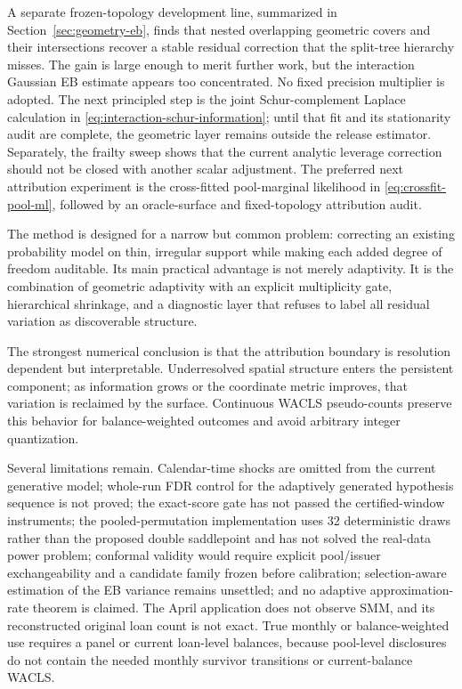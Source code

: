 \documentclass[11pt]{article}
\begin{document}
A separate frozen-topology development line, summarized in
Section~\ref{sec:geometry-eb}, finds that nested overlapping geometric covers and their
intersections recover a stable residual correction that the split-tree hierarchy misses. The gain is
large enough to merit further work, but the interaction Gaussian EB estimate appears too concentrated.
No fixed precision multiplier is adopted. The next principled step is the joint Schur-complement
Laplace calculation in \eqref{eq:interaction-schur-information}; until that fit and its stationarity
audit are complete, the geometric layer remains outside the release estimator. Separately, the
frailty sweep shows that the current analytic leverage correction should not be closed with another
scalar adjustment. The preferred next attribution experiment is the cross-fitted pool-marginal
likelihood in \eqref{eq:crossfit-pool-ml}, followed by an oracle-surface and fixed-topology
attribution audit.

The method is designed for a narrow but common problem: correcting an existing probability model on
thin, irregular support while making each added degree of freedom auditable. Its main practical
advantage is not merely adaptivity. It is the combination of geometric adaptivity with an explicit
multiplicity gate, hierarchical shrinkage, and a diagnostic layer that refuses to label all residual
variation as discoverable structure.

The strongest numerical conclusion is that the attribution boundary is resolution dependent but
interpretable. Underresolved spatial structure enters the persistent component; as information grows
or the coordinate metric improves, that variation is reclaimed by the surface. Continuous WACLS
pseudo-counts preserve this behavior for balance-weighted outcomes and avoid arbitrary integer
quantization.

Several limitations remain. Calendar-time shocks are omitted from the current generative model;
whole-run FDR control for the adaptively generated hypothesis sequence is not proved; the exact-score
gate has not passed the certified-window instruments; the pooled-permutation implementation uses 32
deterministic draws rather than the proposed double saddlepoint and has not solved the real-data power
problem; conformal validity would require explicit pool/issuer exchangeability and a candidate family
frozen before calibration; selection-aware estimation of the EB variance remains unsettled; and no
adaptive approximation-rate theorem is claimed. The April application does not observe SMM, and its
reconstructed original loan count is not exact. True monthly or balance-weighted use requires a panel
or current loan-level balances, because pool-level disclosures do not contain the needed monthly
survivor transitions or current-balance WACLS.
\end{document}
